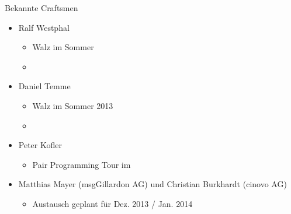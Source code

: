 \begin{frame}{Bekannte Craftsmen}

\begin{itemize}
\item Ralf Westphal
\begin{itemize}
\item Walz im Sommer 
\item
\end{itemize}


\item Daniel Temme
\begin{itemize}
\item Walz im Sommer 2013
\item
\end{itemize}

\item Peter Kofler
\begin{itemize}
\item \glqq{}Pair Programming Tour\grqq{} im  
\end{itemize}

\item Matthias Mayer (msgGillardon AG) und Christian Burkhardt (cinovo AG)
\begin{itemize}
\item Austausch geplant für Dez. 2013 / Jan. 2014
\end{itemize}


\end{itemize}

\end{frame}

